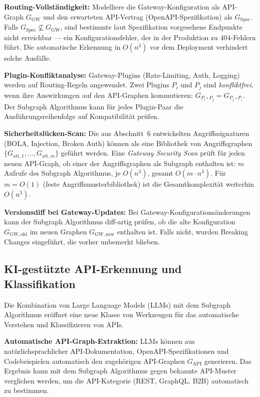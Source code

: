 ﻿\documentclass[a4paper,12pt]{article}
\theoremstyle{definition}
\begin{document}
\textbf{Routing-Vollständigkeit:} Modelliere die Gateway-Konfiguration als
API-Graph $G_{\mathrm{GW}}$ und den erwarteten API-Vertrag (OpenAPI-Spezifikation)
als $G_{\mathrm{Spec}}$. Falls $G_{\mathrm{Spec}} \not\subseteq G_{\mathrm{GW}}$,
sind bestimmte laut Spezifikation vorgesehene Endpunkte nicht erreichbar --- ein
Konfigurationsfehler, der in der Produktion zu 404-Fehlern führt. Die automatische
Erkennung in $O(n^3)$ vor dem Deployment verhindert solche Ausfälle.

\textbf{Plugin-Konfliktanalyse:} Gateway-Plugins (Rate-Limiting, Auth, Logging)
werden auf Routing-Regeln angewendet. Zwei Plugins $P_i$ und $P_j$ sind
\emph{konfliktfrei}, wenn ihre Auswirkungen auf den API-Graphen kommutieren:
$G_{P_i \circ P_j} = G_{P_j \circ P_i}$. Der Subgraph Algorithmus kann für jedes
Plugin-Paar die Ausführungsreihenfolge auf Kompatibilität prüfen.

\textbf{Sicherheitslücken-Scan:} Die aus Abschnitt~6 entwickelten Angriffssignaturen
(BOLA, Injection, Broken Auth) können als eine Bibliothek von Angriffsgraphen
$\{G_{\mathrm{att},1}, \ldots, G_{\mathrm{att},m}\}$ geführt werden. Eine
\emph{Gateway Security Scan} prüft für jeden neuen API-Graph, ob einer der
Angriffsgraphen als Subgraph enthalten ist: $m$ Aufrufe des Subgraph Algorithmus,
je $O(n^3)$, gesamt $O(m \cdot n^3)$. Für $m = O(1)$ (feste Angriffsmusterbibliothek)
ist die Gesamtkomplexität weiterhin $O(n^3)$.

\textbf{Versionsdiff bei Gateway-Updates:} Bei Gateway-Konfigurationsänderungen
kann der Subgraph Algorithmus diff-artig prüfen, ob die alte Konfiguration
$G_{\mathrm{GW,old}}$ im neuen Graphen $G_{\mathrm{GW,new}}$ enthalten ist.
Falls nicht, wurden Breaking Changes eingeführt, die vorher unbemerkt blieben.

\subsection{KI-gestützte API-Erkennung und Klassifikation}

Die Kombination von Large Language Models (LLMs) mit dem Subgraph Algorithmus
eröffnet eine neue Klasse von Werkzeugen für das automatische Verstehen und
Klassifizieren von APIs.

\textbf{Automatische API-Graph-Extraktion:} LLMs können aus natürlichsprachlicher
API-Dokumentation, OpenAPI-Spezifikationen und Codebeispielen automatisch den
zugehörigen API-Graphen $G_{\mathrm{API}}$ generieren. Das Ergebnis kann mit dem
Subgraph Algorithmus gegen bekannte API-Muster verglichen werden, um die API-Kategorie
(REST, GraphQL, B2B) automatisch zu bestimmen.
\end{document}
